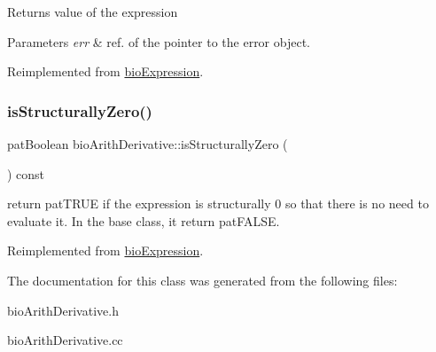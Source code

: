 \begin{DoxyReturn}{Returns}
value of the expression 
\end{DoxyReturn}

\begin{DoxyParams}{Parameters}
{\em err} & ref. of the pointer to the error object. \\
\hline
\end{DoxyParams}


Reimplemented from \hyperlink{classbio_expression_af58662a5d4d456f15bc4f2c9bd4f8a5b}{bio\+Expression}.

\mbox{\label{classbio_arith_derivative_a8de59d734f7c023570046dd184d71a82}} 
\subsubsection{\texorpdfstring{is\+Structurally\+Zero()}{isStructurallyZero()}}
{\footnotesize\ttfamily pat\+Boolean bio\+Arith\+Derivative\+::is\+Structurally\+Zero (\begin{DoxyParamCaption}{ }\end{DoxyParamCaption}) const\hspace{0.3cm}{\ttfamily [virtual]}}

return pat\+T\+R\+UE if the expression is structurally 0 so that there is no need to evaluate it. In the base class, it return pat\+F\+A\+L\+SE. 

Reimplemented from \hyperlink{classbio_expression_a264c6d78671610ada8261d698e4c4c42}{bio\+Expression}.



The documentation for this class was generated from the following files\+:\begin{DoxyCompactItemize}
\item 
bio\+Arith\+Derivative.\+h\item 
bio\+Arith\+Derivative.\+cc\end{DoxyCompactItemize}
